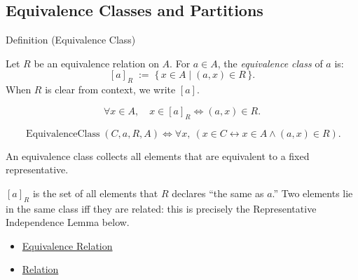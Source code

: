 
\subsection{Equivalence Classes and Partitions}


\begin{definitionbox}{Definition (Equivalence Class)}
\begin{definition}\label{def:equiv-class}
Let $R$ be an equivalence relation on $A$. For $a \in A$, the
\emph{equivalence class} of $a$ is:
\[
[a]_R \;:=\; \{\, x \in A \mid (a,x) \in R \,\}.
\]
When $R$ is clear from context, we write $[a]$.
\end{definition}
\end{definitionbox}

\begin{remark*}
\[
  \forall x\in A,\quad
  x\in [a]_R
  \iff
  (a,x)\in R.
\]
\end{remark*}

\begin{remark*}
\[
  \operatorname{EquivalenceClass}(C,a,R,A)
  \iff
  \forall x,\ (x\in C \leftrightarrow x\in A \wedge (a,x)\in R).
\]
\end{remark*}

\begin{remark*}[Interpretation]
An equivalence class collects all elements that are equivalent to a fixed
representative.
\end{remark*}

\begin{remark*}[Exposition]
$[a]_R$ is the set of all elements that $R$ declares ``the same as $a$.''
Two elements lie in the same class iff they are related: this is precisely
the Representative Independence Lemma below.
\end{remark*}

\begin{dependencies}
\begin{itemize}
  \item \hyperref[def:equivalence-rel]{Equivalence Relation}
  \item \hyperref[def:relation]{Relation}
\end{itemize}
\end{dependencies}

